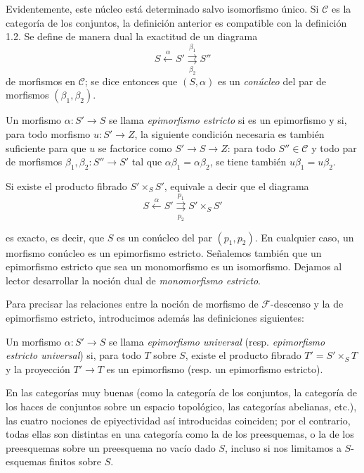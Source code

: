 Evidentemente, este núcleo está determinado salvo isomorfismo único. Si
$\mathcal C$ es la categoría de los conjuntos, la definición anterior es
compatible con la definición 1.2. Se define de manera dual la exactitud de un
diagrama
\[
  S\xleftarrow{\alpha}S'
  \overset{\beta_1}{\underset{\beta_2}{\rightrightarrows}}S''
\]
de morfismos en $\mathcal C$; se dice entonces que $(S,\alpha)$ es un
\emph{conúcleo} del par de morfismos $(\beta_1,\beta_2)$.

 Un morfismo $\alpha:S'\longrightarrow S$ se llama
\emph{epimorfismo estricto} si es un epimorfismo y si, para todo morfismo
$u:S'\longrightarrow Z$, la siguiente condición necesaria es también
suficiente para que $u$ se factorice como
$S'\longrightarrow S\longrightarrow Z$: para todo $S''\in\mathcal C$ y todo
par de morfismos $\beta_1,\beta_2:S''\longrightarrow S'$ tal que
$\alpha\beta_1=\alpha\beta_2$, se tiene también $u\beta_1=u\beta_2$.

Si existe el producto fibrado $S'\times_S S'$, equivale a decir que el diagrama
\[
  S\xleftarrow{\alpha}S'
  \overset{p_1}{\underset{p_2}{\rightrightarrows}}S'\times_S S'
\]

es exacto, es decir, que $S$ es un conúcleo del par $(p_1,p_2)$. En cualquier
caso, un morfismo conúcleo es un epimorfismo estricto. Señalemos también que un
epimorfismo estricto que sea un monomorfismo es un isomorfismo. Dejamos al
lector desarrollar la noción dual de \emph{monomorfismo estricto}.

Para precisar las relaciones entre la noción de morfismo de
$\mathcal F$-descenso y la de epimorfismo estricto, introducimos además las
definiciones siguientes:

 Un morfismo $\alpha:S'\longrightarrow S$ se llama
\emph{epimorfismo universal} (resp. \emph{epimorfismo estricto universal}) si,
para todo $T$ sobre $S$, existe el producto fibrado $T'=S'\times_ST$ y la
proyección $T'\longrightarrow T$ es un epimorfismo (resp. un epimorfismo
estricto).

En las categorías muy buenas (como la categoría de los conjuntos, la
categoría de los haces de conjuntos sobre un espacio topológico, las categorías
abelianas, etc.), las cuatro nociones de epiyectividad así introducidas
coinciden; por el contrario, todas ellas son distintas en una categoría como
la de los preesquemas, o la de los preesquemas sobre un preesquema no vacío
dado $S$, incluso si nos limitamos a $S$-esquemas finitos sobre $S$.

